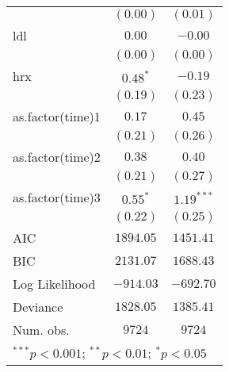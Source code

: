 \begin{tabular}{l c c}
                 & $(0.00)$       & $(0.01)$      \\
ldl              & $0.00$         & $-0.00$       \\
                 & $(0.00)$       & $(0.00)$      \\
hrx              & $0.48^{*}$     & $-0.19$       \\
                 & $(0.19)$       & $(0.23)$      \\
as.factor(time)1 & $0.17$         & $0.45$        \\
                 & $(0.21)$       & $(0.26)$      \\
as.factor(time)2 & $0.38$         & $0.40$        \\
                 & $(0.21)$       & $(0.27)$      \\
as.factor(time)3 & $0.55^{*}$     & $1.19^{***}$  \\
                 & $(0.22)$       & $(0.25)$      \\
\midrule
AIC              & $1894.05$      & $1451.41$     \\
BIC              & $2131.07$      & $1688.43$     \\
Log Likelihood   & $-914.03$      & $-692.70$     \\
Deviance         & $1828.05$      & $1385.41$     \\
Num. obs.        & $9724$         & $9724$        \\
\bottomrule
\multicolumn{3}{l}{\scriptsize{$^{***}p<0.001$; $^{**}p<0.01$; $^{*}p<0.05$}}
\end{tabular}
